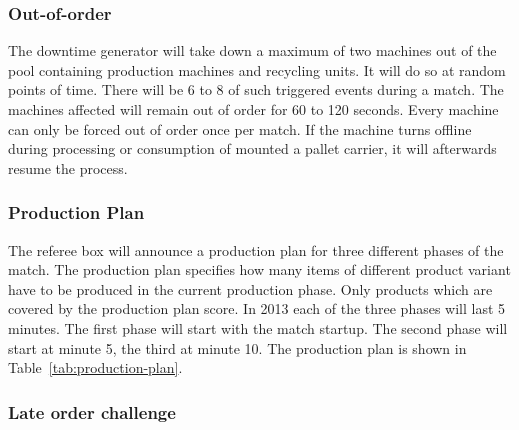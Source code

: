 \documentclass[12pt,twoside]{article}
\newcommand{\mytable}[1]{\savebox{\myt}{#1}\tikz\node[fill=gray!25!white]{\usebox{\myt}};}
\begin{document}
\subsubsection{Out-of-order}

The downtime generator will take down a maximum of two machines out of
the pool containing production machines and recycling units. It will
do so at random points of time. There will be 6 to 8 of such triggered
events during a match. The machines affected will remain out of order
for 60 to 120 seconds. Every machine can only be forced out of order
once per match. If the machine turns offline during processing or
consumption of mounted a pallet carrier, it will afterwards resume the
process.

\subsubsection{Production Plan}

The referee box will announce a production plan for three different
phases of the match. The production plan specifies how many items of
different product variant have to be produced in the current
production phase. Only products which are covered by the production
plan score. In 2013 each of the three phases will last 5 minutes. The
first phase will start with the match startup.  The second phase will
start at minute 5, the third at minute 10. The production plan is
shown in Table~\ref{tab:production-plan}.






\subsubsection{Late order challenge}
\end{document}
